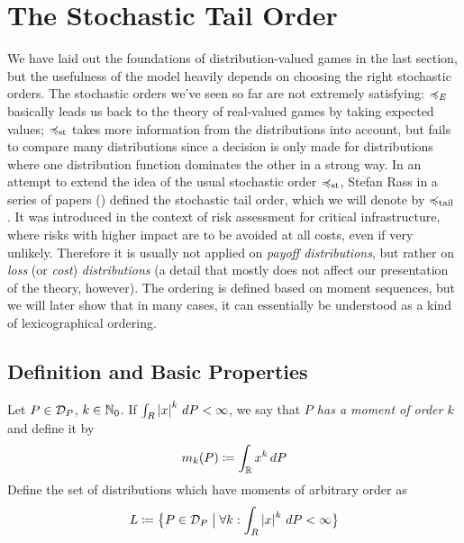 \documentclass[a4paper]{scrreprt}
\begin{document}
    \section{The Stochastic Tail Order}
    We have laid out the foundations of distribution-valued games in the last section, but the usefulness of the model heavily depends on choosing the right stochastic orders.
    The stochastic orders we've seen so far are not extremely satisfying: $\preccurlyeq_E$ basically leads us back to the theory of real-valued games by taking expected values; $\preccurlyeq_{\text{st}}$ takes more information from the distributions into account, but fails to compare many distributions since a decision is only made for distributions where one distribution function dominates the other in a strong way.
    In an attempt to extend the idea of the usual stochastic order $\preccurlyeq_{\text{st}}$, Stefan Rass in a series of papers (\cite{bib:rassGameRiskManagI,bib:rassGameRiskManagII,bib:rassTotalOrderingOnLossDistributions}) defined the stochastic tail order, which we will denote by $\preccurlyeq_{\text{tail}}$ .
    It was introduced in the context of risk assessment for critical infrastructure, where risks with higher impact are to  be avoided at all costs, even if very unlikely.
    Therefore it is usually not applied on \emph{payoff distributions}, but rather on \emph{loss} (or \emph{cost}) \emph{distributions} (a detail that mostly does not affect our presentation of the theory, however).
    The ordering is defined based on moment sequences, but we will later show that in many cases, it can essentially be understood as a kind of lexicographical ordering.

    \subsection{Definition and Basic Properties}    
    \newcommand{\Lallmoms}{L}
    \begin{defn}[Moments]
        Let $P \in \mathcal{D}_P$, $k \in \mathbb{N}_0$. If $\int_{R} \left| x \right|^k \, dP < \infty$, we say that \emph{$P$ has a moment of order $k$} and define it by
        \begin{gather*}
            m_k(P) \coloneqq \int_{\mathbb{R}} x^k \, dP
        \end{gather*}
        Define the set of distributions which have moments of arbitrary order as
        \begin{gather*}
            \Lallmoms \coloneqq \bigset{P \in \DP \bigmid \forall k: \lintegral{R}{\abs{x}^k}{P} < \infty}
        \end{gather*}
    \end{defn}
\end{document}
